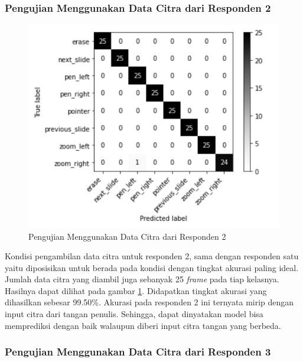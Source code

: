 \subsubsection{Pengujian Menggunakan Data Citra dari Responden 2}
\label{subsec:Pengujian Menggunakan Data Citra dari Responden 2}

\begin{figure}[ht]
  \centering
  \includegraphics[scale=0.9]{gambar/pengujian-ukuran-tangan/tangan-ari.png}
  \caption{Pengujian Menggunakan Data Citra dari Responden 2}
  \label{fig:Pengujian Menggunakan Data Citra dari Responden 2}
\end{figure}

Kondisi pengambilan data citra untuk responden 2, sama dengan responden satu yaitu diposisikan untuk berada pada kondisi dengan tingkat akurasi paling ideal. Jumlah data citra yang diambil juga sebanyak 25 \emph{frame} pada tiap kelasnya. Hasilnya dapat dilihat pada gambar \ref{fig:Pengujian Menggunakan Data Citra dari Responden 2}. Didapatkan tingkat akurasi yang dihasilkan sebesar 99.50\%. Akurasi pada responden 2 ini ternyata mirip dengan input citra dari tangan penulis. Sehingga, dapat dinyatakan model bisa memprediksi dengan baik walaupun diberi input citra tangan yang berbeda.

\subsubsection{Pengujian Menggunakan Data Citra dari Responden 3}
\label{subsec:Pengujian Menggunakan Data Citra dari Responden 3}

